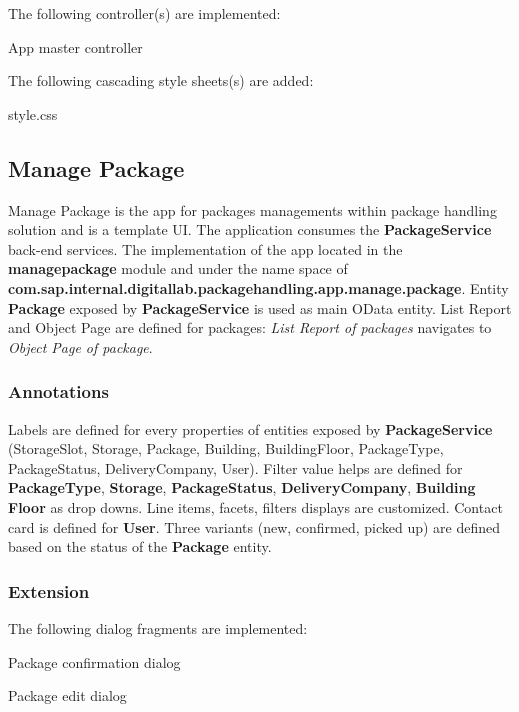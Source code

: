 \bigskip
The following controller(s) are implemented:
\begin{compactenum}
    \item App master controller
\end{compactenum}

\bigskip
The following cascading style sheets(s) are added:
\begin{compactenum}
    \item style.css
\end{compactenum}

\subsection{Manage Package}

Manage Package is the app for packages managements within package handling solution and is a template UI.
The application consumes the \textbf{PackageService} back-end services.
The implementation of the app
located in the \textbf{managepackage} module and under the name space of
\textbf{com.sap.internal.digitallab.packagehandling.app.manage.package}.
Entity \textbf{Package} exposed by  \textbf{PackageService} is used as main OData entity.
List Report and Object Page are defined for packages: \textit{List Report of packages} navigates to \textit{Object Page of package}.

\subsubsection{Annotations}
Labels are defined for every properties of entities exposed by \textbf{PackageService} (StorageSlot, Storage, Package, Building, BuildingFloor, PackageType, PackageStatus, DeliveryCompany, User). 
Filter value helps are defined for \textbf{PackageType}, \textbf{Storage}, \textbf{PackageStatus}, \textbf{DeliveryCompany}, \textbf{Building Floor} as drop downs.
Line items, facets, filters displays are customized.
Contact card is defined for \textbf{User}.
Three variants (new, confirmed, picked up) are defined based on the status of the \textbf{Package} entity.

\subsubsection{Extension}
The following dialog fragments are implemented:
\begin{compactenum}
    \item Package confirmation dialog
    \item Package edit dialog
\end{compactenum}

